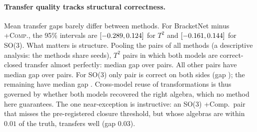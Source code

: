 \paragraph{Transfer quality tracks structural correctness.}
Mean transfer gaps barely differ between methods. For BracketNet minus \textsc{+Comp.}, the 95\% intervals are
$[-0.289,0.124]$ for $T^2$ and
$[-0.161,0.144]$ for SO(3). What matters is structure.
Pooling the pairs of all methods (a descriptive analysis: the methods share seeds), $T^2$ pairs in which both models
are correct-closed transfer almost perfectly: median gap \NTcTtwoBothcorrectMedian{} over \NTcTtwoBothcorrectN{}
pairs. All other pairs have median gap \NTcTtwoNotbothcorrectMedian{} over \NTcTtwoNotbothcorrectN{} pairs. For
SO(3) only \NTcSOthreeBothcorrectN{} pair is correct on both sides (gap \NTcSOthreeBothcorrectMedian); the remaining
\NTcSOthreeNotbothcorrectN{} have median gap \NTcSOthreeNotbothcorrectMedian. Cross-model reuse of transformations is
thus governed by whether both models recovered the right algebra, which no method here guarantees. The one
near-exception is instructive: an SO(3) +Comp.\ pair that misses the pre-registered closure threshold, but whose
algebras are within $0.01$ of the truth, transfers well (gap $0.03$).
